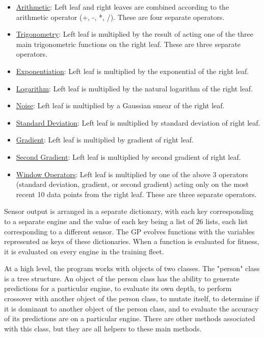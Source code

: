 \documentclass{acm_proc_article-sp}
\begin{document}
\begin{itemize}
\item {\underline{Arithmetic}}: Left leaf and right leaves are combined according to the arithmetic operator (+, -, *, /). These are four separate operators.
\item {\underline{Trigonometry}}: Left leaf is multiplied by the result of acting one of the three main trigonometric functions on the right leaf. These are three separate operators.
\item {\underline{Exponentiation}}: Left leaf is multiplied by the exponential of the right leaf.
\item {\underline{Logarithm}}: Left leaf is multiplied by the natural logarithm of the right leaf.
\item {\underline{Noise}}: Left leaf is multiplied by a Gaussian smear of the right leaf.
\item {\underline{Standard Deviation}}: Left leaf is multiplied by standard deviation of right leaf.
\item {\underline{Gradient}}: Left leaf is multiplied by gradient of right leaf.
\item {\underline{Second Gradient}}: Left leaf is multiplied by second gradient of right leaf.
\item {\underline{Window Operators}}: Left leaf is multiplied by one of the above 3 operators (standard deviation, gradient, or second gradient) acting only on the most recent 10 data points from the right leaf. These are three separate operators.
\end{itemize}

Sensor output is arranged in a separate dictionary, with each key corresponding to a separate engine and the value of each key being a list of 26 lists, each list corresponding to a different sensor. The GP evolves functions with the variables represented as keys of these dictionaries. When a function is evaluated for fitness, it is evaluated on every engine in the training fleet.

At a high level, the program works with objects of two classes. The "person" class is a tree structure. An object of the person class has the ability to generate predictions for a particular engine, to evaluate its own depth, to perform crossover with another object of the person class, to mutate itself, to determine if it is dominant to another object of the person class, and to evaluate the accuracy of its predictions are on a particular engine. There are other methods associated with this class, but they are all helpers to these main methods.
\end{document}
